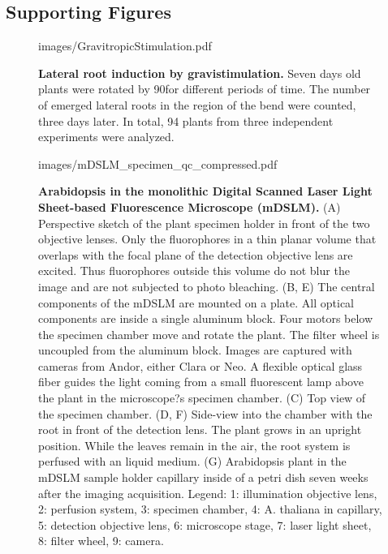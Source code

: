 \documentclass[11pt,a4paper, final]{article}
\begin{document}
\subsection{Supporting Figures}
\setcounter{figure}{0}
\makeatletter 
\renewcommand{\thefigure}{S\@arabic\c@figure}
\makeatother
%
\begin{figure}[htbp]
	\begin{center}
	\begin{overpic}[width=1.\linewidth]{images/GravitropicStimulation.pdf}
	\end{overpic}
\caption[Lateral root induction by gravistimulation.]
{{\bf Lateral root induction by gravistimulation.} Seven days old plants were rotated by 90\degree  for different periods of time. The number of emerged lateral roots in the region of the bend were counted, three days later. In total, 94 plants from three independent experiments were analyzed.}
	\label{fig:gravistimul}
	\end{center}
\end{figure}
%
\clearpage
\begin{figure}[htbp]
	\begin{center}
	\begin{overpic}[width=1.\linewidth]{images/mDSLM_specimen_qc_compressed.pdf}
	\end{overpic}
\caption[Arabidopsis in the monolithic Digital Scanned Laser Light Sheet-based Fluorescence Microscope (mDSLM).]
{{\bf Arabidopsis in the monolithic Digital Scanned Laser Light Sheet-based Fluorescence Microscope (mDSLM).} 
(A) Perspective sketch of the plant specimen holder in front of the two objective lenses. Only the fluorophores in a thin planar volume that overlaps with the focal plane of the detection objective lens are excited. Thus fluorophores outside this volume do not blur the image and are not subjected to photo bleaching. (B, E) The central components of the mDSLM are mounted on a plate. All optical components are inside a single aluminum block. Four motors below the specimen chamber move and rotate the plant. The filter wheel is uncoupled from the aluminum block. Images are captured with cameras from Andor, either Clara or Neo. A flexible optical glass fiber guides the light coming from a small fluorescent lamp above the plant in the microscope?s specimen chamber. (C) Top view of the specimen chamber. (D, F) Side-view into the chamber with the root in front of the detection lens. The plant grows in an upright position. While the leaves remain in the air, the root system is perfused with an liquid medium. (G) Arabidopsis plant in the mDSLM sample holder capillary inside of a petri dish seven weeks after the imaging acquisition. Legend: 1: illumination objective lens, 2: perfusion system, 3: specimen chamber, 4: A. thaliana in capillary, 5: detection objective lens, 6: microscope stage, 7: laser light sheet, 8: filter wheel, 9: camera.}
	\label{fig:mDSLM}
	\end{center}
\end{figure}
\end{document}
